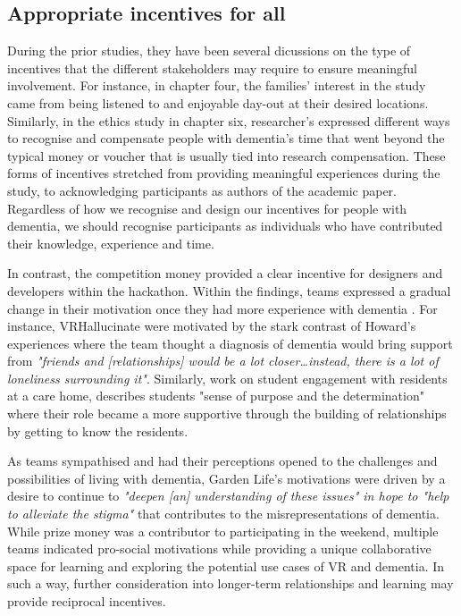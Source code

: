 \subsection{Appropriate incentives for all}
\label{RQ4:Incentives}
During the prior studies, they have been several dicussions on the type of incentives that the different stakeholders may require to ensure meaningful involvement. For instance, in chapter four, the families' interest in the study came from being listened to and enjoyable day-out at their desired locations. Similarly, in the ethics study in chapter six, researcher's expressed different ways to recognise and compensate people with dementia's time that went beyond the typical money or voucher that is usually tied into research compensation. These forms of incentives stretched from providing meaningful experiences during the study, to acknowledging participants as authors of the academic paper. Regardless of how we recognise and design our incentives for people with dementia, we should recognise participants as individuals who have contributed their knowledge, experience and time.  

In contrast, the competition money provided a clear incentive for designers and developers within the hackathon. Within the findings, teams expressed a gradual change in their motivation once they had more experience with dementia \citep{gama2017crowdsourced}. For instance, VRHallucinate were motivated by the stark contrast of Howard's experiences where the team thought a diagnosis of dementia would bring support from \textit{"friends and [relationships] would be a lot closer…instead, there is a lot of loneliness surrounding it"}. Similarly, \citep{foley_student_2020} work on student engagement with residents at a care home, describes students "sense of purpose and the determination" where their role became a more supportive through the building of relationships by getting to know the residents.  

As teams sympathised and had their perceptions opened to the challenges and possibilities of living with dementia, Garden Life's motivations were driven by a desire to continue to \textit{"deepen [an] understanding of these issues" in hope to "help to alleviate the stigma"} that contributes to the misrepresentations of dementia. While prize money was a contributor to participating in the weekend, multiple teams indicated pro-social motivations while providing a unique collaborative space for learning and exploring the potential use cases of VR and dementia. In such a way, further consideration into longer-term relationships and learning may provide reciprocal incentives. 

